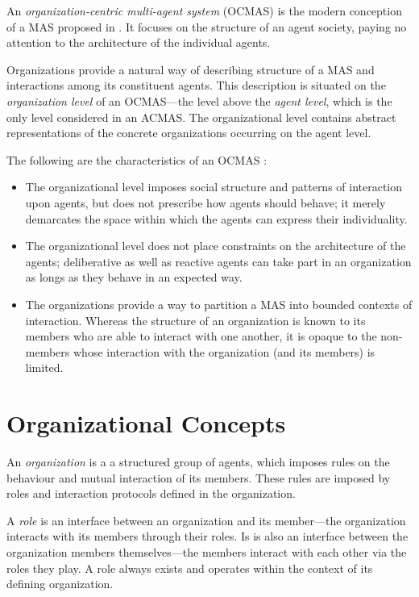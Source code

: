 An \textit{organization-centric multi-agent system} (OCMAS) is the modern conception of a MAS proposed in \cite{Ferber03}.
It focuses on the structure of an agent society, paying no attention to the architecture of the individual agents.

Organizations provide a natural way of describing structure of a MAS and interactions among its constituent agents.
This description is situated on the \textit{organization level} of an OCMAS---the level above the \textit{agent level}, which is the only level considered in an ACMAS.
The organizational level contains abstract representations of the concrete organizations occurring on the agent level.

The following are the characteristics of an OCMAS \cite{Ferber03}:
\begin{itemize}
	\item The organizational level imposes social structure and patterns of interaction upon agents, but does not prescribe how agents should behave; it merely demarcates the space within which the agents can express their individuality.
	\item The organizational level does not place constraints on the architecture of the agents; deliberative as well as reactive agents can take part in an organization as longs as they behave in an expected way.
	\item The organizations provide a way to partition a MAS into bounded contexts of interaction.
	Whereas the structure of an organization is known to its members who are able to interact with one another, it is opaque to the non-members whose interaction with the organization (and its members) is limited.
\end{itemize}

\section{Organizational Concepts}

An \textit{organization} is a a structured group of agents, which imposes rules on the behaviour and mutual interaction of its members. 
These rules are imposed by roles and interaction protocols defined in the organization.

A \textit{role} is an interface between an organization and its member---the organization interacts with its members through their roles.
Is is also an interface between the organization members themselves---the members interact with each other via the roles they play.
A role always exists and operates within the context of its defining organization.

